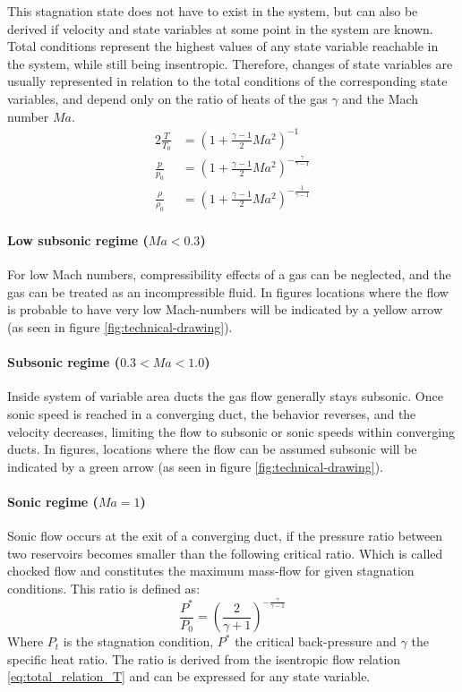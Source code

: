 	This stagnation state does not have to exist in the system, but can also be derived if velocity and state variables at some point in the system are known.
	Total conditions represent the highest values of any state variable reachable in the system, while still being insentropic.
	Therefore, changes of state variables are usually represented in relation to the total conditions of the corresponding state variables, and depend only on the ratio of heats of the gas $\gamma$ and the Mach number $Ma$.
	\begin{alignat}{2}
	    \frac{T}{T_0}   & = \left( 1 + \frac{\gamma - 1}{2} Ma^2 \right)^{-1} \label{eq:total_relation_T}\\
	    \frac{p}{p_0}   & = \left( 1 + \frac{\gamma - 1}{2} Ma^2 \right)^{-\frac{\gamma}{\gamma - 1}} \label{eq:total_relation_p}\\
	    \frac{\rho}{\rho_0} & = \left( 1 + \frac{\gamma - 1}{2} Ma^2 \right)^{-\frac{1}{\gamma - 1}} \label{eq:total_relation_rho}
	\end{alignat}

	\paragraph{Low subsonic regime ($Ma < 0.3$)}
		For low Mach numbers, compressibility effects of a gas can be neglected, and the gas can be treated as an incompressible fluid.
		In figures locations where the flow is probable to have very low Mach-numbers will be indicated by a yellow arrow (as seen in figure \ref{fig:technical-drawing}).

	\paragraph{Subsonic regime ($0.3 < Ma < 1.0$)} 
		Inside system of variable area ducts the gas flow generally stays subsonic.
		Once sonic speed is reached in a converging duct, the behavior reverses, and the velocity decreases, limiting the flow to subsonic or sonic speeds within converging ducts.
		In figures, locations where the flow can be assumed subsonic will be indicated by a green arrow (as seen in figure \ref{fig:technical-drawing}).\\
		

	\paragraph{Sonic regime ($Ma = 1$)}
		Sonic flow occurs at the exit of a converging duct, if the pressure ratio between two reservoirs becomes smaller than the following critical ratio.
		Which is called chocked flow and constitutes the maximum mass-flow for given stagnation conditions. 
		This ratio is defined as:
		\begin{equation}
			\frac{P^*}{P_0}=\left(\frac{2}{\gamma + 1}\right)^{-\frac{\gamma}{\gamma - 1}}
		\end{equation}\label{eq:critical-pressure}
		Where $P_t$ is the stagnation condition, $P^*$ the critical back-pressure and $\gamma$ the specific heat ratio.
		The ratio is derived from the isentropic flow relation \eqref{eq:total_relation_T} and can be expressed for any state variable.

